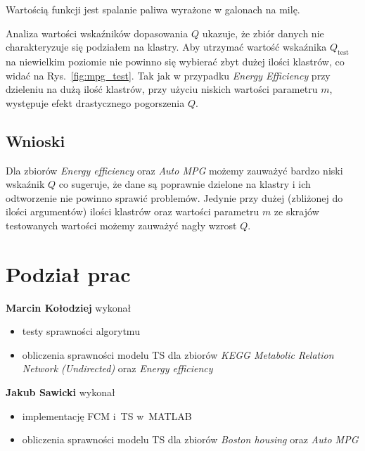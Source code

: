 \documentclass[a4paper; 11pt]{article}
\begin{document}
Wartością funkcji jest spalanie paliwa wyrażone w galonach na milę.

Analiza wartości wskaźników dopasowania $Q$ ukazuje, że zbiór danych nie
charakteryzuje się podziałem na klastry.
Aby utrzymać wartość wskaźnika $Q_\text{test}$ na niewielkim poziomie nie
powinno się wybierać zbyt dużej ilości klastrów, co widać na Rys.~\ref{fig:mpg_test}.
Tak jak w przypadku \emph{Energy Efficiency} przy dzieleniu na dużą ilość klastrów,
przy użyciu niskich wartości parametru $m$, występuje efekt drastycznego pogorszenia $Q$.

\subsection{Wnioski}
Dla zbiorów \emph{Energy efficiency} oraz \emph{Auto MPG} możemy zauważyć bardzo niski wskaźnik $Q$ co sugeruje,
że dane są poprawnie dzielone na klastry i ich odtworzenie nie powinno sprawić problemów. Jedynie przy dużej
(zbliżonej do ilości argumentów) ilości klastrów oraz wartości parametru $m$ ze skrajów testowanych wartości
możemy zauważyć nagły wzrost $Q$.

\section{Podział prac}

\textbf{Marcin Kołodziej} wykonał
\begin{itemize}
\item testy sprawności algorytmu
\item obliczenia sprawności modelu TS dla zbiorów \emph{KEGG Metabolic Relation Network (Undirected)} oraz \emph{Energy efficiency}
\end{itemize}

\textbf{Jakub Sawicki} wykonał
\begin{itemize}
\item implementację FCM i~TS w~MATLAB
\item obliczenia sprawności modelu TS dla zbiorów \emph{Boston housing} oraz \emph{Auto MPG}
\end{itemize}
\end{document}
